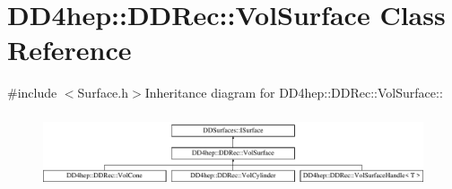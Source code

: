 \hypertarget{class_d_d4hep_1_1_d_d_rec_1_1_vol_surface}{
\section{DD4hep::DDRec::VolSurface Class Reference}
\label{class_d_d4hep_1_1_d_d_rec_1_1_vol_surface}
}


{\ttfamily \#include $<$Surface.h$>$}Inheritance diagram for DD4hep::DDRec::VolSurface::\begin{figure}[H]
\begin{center}
\leavevmode
\includegraphics[height=2.21344cm]{class_d_d4hep_1_1_d_d_rec_1_1_vol_surface}
\end{center}
\end{figure}
